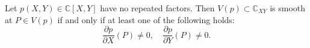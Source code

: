 Let $p(X, Y) \in \mathbb{C}[X, Y]$ have no repeated factors. Then $V(p) \subset \mathbb{C}_{XY}$ is smooth at $P \in V(p)$ if and only if at least one of the following holds:
$$\frac{\partial p}{\partial X}(P) \neq 0, \quad \frac{\partial p}{\partial Y}(P) \neq 0.$$
